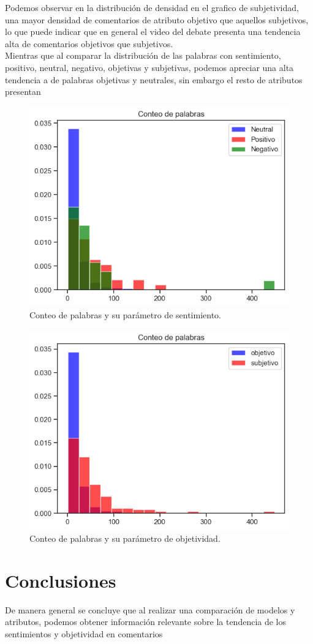 Podemos observar en la distribución de densidad en el grafico de subjetividad, una mayor densidad de comentarios de atributo objetivo que aquellos subjetivos, lo que puede indicar que en general el video del debate presenta una tendencia alta de comentarios objetivos que subjetivos.\\

Mientras que al comparar la distribución de las palabras con sentimiento, positivo, neutral, negativo, objetivas y subjetivas, podemos apreciar una alta tendencia a de palabras objetivas y neutrales, sin embargo el resto de atributos presentan 

\begin{figure}[h!]
	\centering
	\includegraphics[width=12cm]{Images/Palabras_sentimiento}
	\caption{Conteo de palabras y su parámetro de sentimiento.}
	\label{fig:CPPS}
\end{figure}

\begin{figure}[h!]
	\centering
	\includegraphics[width=12cm]{Images/Palabras_objetividad}
	\caption{Conteo de palabras y su parámetro de objetividad.}
	\label{fig:CPPo}
\end{figure}
\chapter{Conclusiones}

De manera general se concluye que al realizar una comparación de modelos y atributos, podemos obtener información relevante sobre la tendencia de los sentimientos y objetividad en comentarios 

